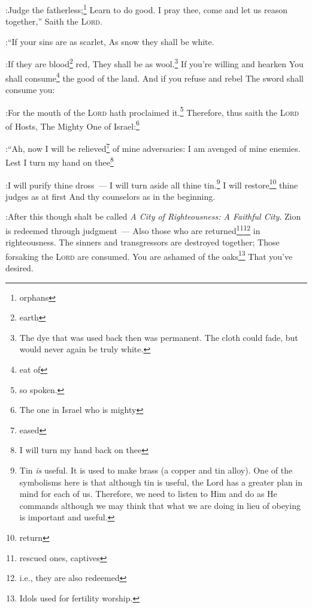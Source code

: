 


\begin{enumerate*}[mode=unboxed]
    
    :Judge the fatherless;\footnote{orphans} Learn to do good.%
     I pray thee, come and let us reason together,'' Saith the \textsc{Lord}.%

:``If your sins are as scarlet, As snow they shall be white.%

:If they are blood\footnote{earth} red, They shall be as wool.\footnote{The dye that was used back then was permanent. The cloth could fade, but would never again be truly white.}%
     If you're willing and hearken You shall consume\footnote{eat of} the good of the land.%
     And if you refuse and rebel The sword shall consume you:%

:For the mouth of the \textsc{Lord} hath proclaimed it.\footnote{so spoken.}%
     Therefore, thus saith the \textsc{Lord} of Hosts, The Mighty One of Israel:\footnote{The one in Israel who is mighty}%

:``Ah, now I will be relieved\footnote{eased} of mine adversaries: I am avenged of mine enemies.%
     Lest I turn my hand on thee\footnote{I will turn my hand back on thee}%

:I will purify thine dross~--- I will turn aside all thine tin.\footnote{Tin \emph{is} useful. It is used to make brass (a copper and tin alloy). One of the symbolisms here is that although tin is useful, the Lord has a greater plan in mind for each of us. Therefore, we need to listen to Him and do as He commands although we may think that what we are doing in lieu of obeying is important and useful.}%
     I will restore\footnote{return} thine judges as at first And thy counselors as in the beginning.%

:After this though shalt be called \textit{A City of Righteousness: A Faithful City}.%
     Zion is redeemed through judgment~--- Also those who are returned\footnote{rescued ones, captives}\footnote{i.e., they are also redeemed} in righteousness.%
     The sinners and transgressors are destroyed together; Those forsaking the \textsc{Lord} are consumed.%
     You are ashamed of the oaks\footnote{Idols used for fertility worship.} That you've desired.%


\end{enumerate*}
